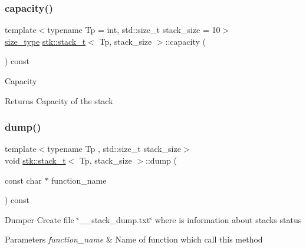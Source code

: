 \subsubsection{\texorpdfstring{capacity()}{capacity()}}
{\footnotesize\ttfamily template$<$typename Tp  = int, std\+::size\+\_\+t stack\+\_\+size = 10$>$ \\
\hyperlink{classstk_1_1stack__t_ade199c494a8e4455f76cc04faf138ed8}{size\+\_\+type} \hyperlink{classstk_1_1stack__t}{stk\+::stack\+\_\+t}$<$ Tp, stack\+\_\+size $>$\+::capacity (\begin{DoxyParamCaption}{ }\end{DoxyParamCaption}) const\hspace{0.3cm}{\ttfamily [inline]}}

Capacity \begin{DoxyReturn}{Returns}
Capacity of the stack 
\end{DoxyReturn}
\mbox{\label{classstk_1_1stack__t_a3dd66fcfd99c93c63cdab500bbf5a7e8}} 
\subsubsection{\texorpdfstring{dump()}{dump()}}
{\footnotesize\ttfamily template$<$typename Tp , std\+::size\+\_\+t stack\+\_\+size$>$ \\
void \hyperlink{classstk_1_1stack__t}{stk\+::stack\+\_\+t}$<$ Tp, stack\+\_\+size $>$\+::dump (\begin{DoxyParamCaption}\item[{const char $\ast$}]{function\+\_\+name }\end{DoxyParamCaption}) const\hspace{0.3cm}{\ttfamily [private]}}

Dumper Create file \char`\"{}\+\_\+\+\_\+stack\+\_\+dump.\+txt\char`\"{} where is information about stack\textquotesingle{}s status 
\begin{DoxyParams}{Parameters}
{\em function\+\_\+name} & Name of function which call this method \\
\hline
\end{DoxyParams}
\mbox{\label{classstk_1_1stack__t_adb144d5de96aeeed6dee8d902158f1a6}} 
